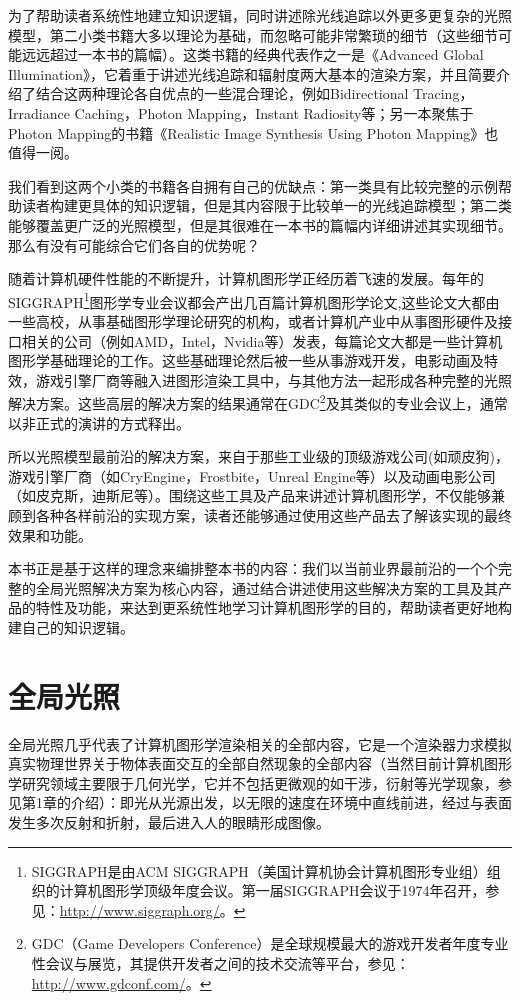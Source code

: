 为了帮助读者系统性地建立知识逻辑，同时讲述除光线追踪以外更多更复杂的光照模型，第二小类书籍大多以理论为基础，而忽略可能非常繁琐的细节（这些细节可能远远超过一本书的篇幅）。这类书籍的经典代表作之一是《Advanced Global Illumination》，它着重于讲述光线追踪和辐射度两大基本的渲染方案，并且简要介绍了结合这两种理论各自优点的一些混合理论，例如Bidirectional Tracing，Irradiance Caching，Photon Mapping，Instant Radiosity等；另一本聚焦于Photon Mapping的书籍《Realistic Image Synthesis Using Photon Mapping》\cite{b:RealisticImageSynthesisUsingPhotonMapping}也值得一阅。

我们看到这两个小类的书籍各自拥有自己的优缺点：第一类具有比较完整的示例帮助读者构建更具体的知识逻辑，但是其内容限于比较单一的光线追踪模型；第二类能够覆盖更广泛的光照模型，但是其很难在一本书的篇幅内详细讲述其实现细节。那么有没有可能综合它们各自的优势呢？

随着计算机硬件性能的不断提升，计算机图形学正经历着飞速的发展。每年的SIGGRAPH\footnote{SIGGRAPH是由ACM SIGGRAPH（美国计算机协会计算机图形专业组）组织的计算机图形学顶级年度会议。第一届SIGGRAPH会议于1974年召开，参见：\url{http://www.siggraph.org/}。}图形学专业会议都会产出几百篇计算机图形学论文,这些论文大都由一些高校，从事基础图形学理论研究的机构，或者计算机产业中从事图形硬件及接口相关的公司（例如AMD，Intel，Nvidia等）发表，每篇论文大都是一些计算机图形学基础理论的工作。这些基础理论然后被一些从事游戏开发，电影动画及特效，游戏引擎厂商等融入进图形渲染工具中，与其他方法一起形成各种完整的光照解决方案。这些高层的解决方案的结果通常在GDC\footnote{GDC（Game Developers Conference）是全球规模最大的游戏开发者年度专业性会议与展览，其提供开发者之间的技术交流等平台，参见：\url{http://www.gdconf.com/}。}及其类似的专业会议上，通常以非正式的演讲的方式释出。

所以光照模型最前沿的解决方案，来自于那些工业级的顶级游戏公司(如顽皮狗)，游戏引擎厂商（如CryEngine，Frostbite，Unreal Engine等）以及动画电影公司（如皮克斯，迪斯尼等）。围绕这些工具及产品来讲述计算机图形学，不仅能够兼顾到各种各样前沿的实现方案，读者还能够通过使用这些产品去了解该实现的最终效果和功能。

本书正是基于这样的理念来编排整本书的内容：我们以当前业界最前沿的一个个完整的全局光照解决方案为核心内容，通过结合讲述使用这些解决方案的工具及其产品的特性及功能，来达到更系统性地学习计算机图形学的目的，帮助读者更好地构建自己的知识逻辑。



\section*{全局光照}
全局光照几乎代表了计算机图形学渲染相关的全部内容，它是一个渲染器力求模拟真实物理世界关于物体表面交互的全部自然现象的全部内容（当然目前计算机图形学研究领域主要限于几何光学，它并不包括更微观的如干涉，衍射等光学现象，参见第1章的介绍）：即光从光源出发，以无限的速度在环境中直线前进，经过与表面发生多次反射和折射，最后进入人的眼睛形成图像。

